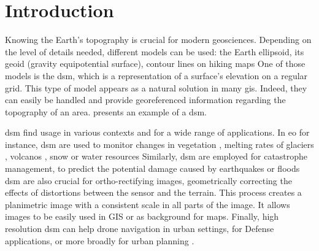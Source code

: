 

\chapter*{Introduction}
Knowing the Earth's topography is crucial for modern geosciences. Depending on the level of details needed, different models can be used: the Earth ellipsoid, its geoid (gravity equipotential surface), contour lines on hiking maps \etc One of those models is the \acrfull{dsm}, which is a representation of a surface's elevation on a regular grid. This type of model appears as a natural solution in many \acrfull{gis}. Indeed, they can easily be handled and provide georeferenced information regarding the topography of an area.  presents an example of a \acrshort{dsm}.

\acrshort{dsm} find usage in various contexts and for a wide range of applications. In \acrfull{eo} for instance, \acrshort{dsm} are used to monitor changes in vegetation \cite{sadeghi_canopy_2016}, melting rates of glaciers \cite{berthier_glacier_2014, rieg_pleiades_2018}, volcanos \cite{ganci_data_2022}, snow or water resources \cite{marti_mapping_2016, gascoin_theia_2019, yamazaki_merit_2019} \etc{} Similarly, \acrshort{dsm} are employed for catastrophe management, to predict the potential damage caused by earthquakes or floods \cite{jenkins_physics-based_2023} \etc{} \acrshort{dsm} are also crucial for ortho-rectifying images, \ie geometrically correcting the effects of distortions between the sensor and the terrain. This process creates a planimetric image with a consistent scale in all parts of the image. It allows images to be easily used in GIS or as background for maps. Finally, high resolution \acrshort{dsm} can help drone navigation in urban settings, for Defense applications, or more broadly for urban planning \cite{velazco_3d_2012}.

